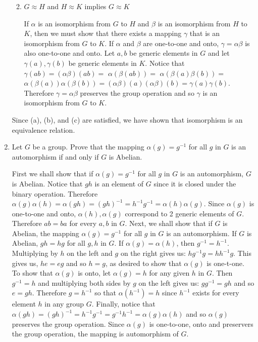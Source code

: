 \documentclass{article}
\begin{document}
\begin{enumerate}
\begin{enumerate}
\begin{flushleft}
        \end{flushleft}
        \item $G \approx H$ and $H \approx K$ implies $G \approx K$
        \begin{flushleft}
        If $\alpha$ is an isomorphism from $G$ to $H$ and $\beta$ is an isomorphism from $H$ to $K$, then we must show that there exists a mapping $\gamma$ that is an isomorphism from $G$ to $K$. If $\alpha$ and $\beta$ are one-to-one and onto, $\gamma = \alpha\beta$ is also one-to-one and onto.  Let $a, b$ be generic elements in $G$ and let $\gamma(a), \gamma(b)$ be generic elements in $K$. Notice that $\gamma(ab) = ( \alpha \beta ) ( a b ) =$ $ \alpha ( \beta ( a b ) ) =$ $ \alpha ( \beta ( a ) \beta ( b ) ) =$ $ \alpha ( \beta ( a ) ) \alpha ( \beta ( b ) ) = ( \alpha \beta ) ( a ) ( \alpha \beta ) ( b ) = \gamma(a)\gamma(b)$. Therefore $\gamma = \alpha\beta$ preserves the group operation and so $\gamma$ is an isomorphism from $G$ to $K$.
        \end{flushleft}
    \end{enumerate}
    Since (a), (b), and (c) are satisfied, we have shown that isomorphism is an equivalence relation.
    \item Let $G$ be a group. Prove that the mapping $\alpha(g) = g^{-1}$ for all $g$ in $G$ is an automorphism if and only if $G$ is Abelian.
    \begin{flushleft}
    First we shall show that if $\alpha(g) = g^{-1}$ for all $g$ in $G$ is an automorphism, $G$ is Abelian. Notice that $gh$ is an element of $G$ since it is closed under the binary operation. Therefore $\alpha(g)\alpha(h) = \alpha(gh) = (gh)^{-1} = h^{-1}g^{-1} = \alpha(h)\alpha(g)$. Since $\alpha(g)$ is one-to-one and onto, $ \alpha(h), \alpha(g)$ correspond to 2 generic elements of $G$. Therefore $ab = ba$ for every $a, b$ in $G$. Next, we shall show that if $G$ is Abelian, the mapping $\alpha(g) = g^{-1}$ for all $g$ in $G$ is an automorphism. If $G$ is Abelian, $gh = hg$ for all $g, h$ in $G$. If $\alpha(g) = \alpha(h)$, then $g^{-1} = h^{-1}$. Multiplying by $h$ on the left and $g$ on the right gives us: $hg^{-1}g = hh^{-1}g$. This gives us, $he = eg$ and so $h = g$, as desired to show that $\alpha(g)$ is one-t-one. To show that $\alpha(g)$ is onto, let $\alpha(g) = h$ for any given $h$ in $G$. Then $g^{-1} = h$ and multiplying both sides by $g$ on the left gives us: $gg^{-1} = gh$ and so $e = gh$. Therefore $g = h^{-1}$ so that $\alpha(h^{-1}) = h$ since $h^{-1}$ exists for every element $h$ in any group $G$. Finally, notice that $\alpha(gh) = (gh)^{-1} = h^{-1}g^{-1} = g^{-1}h^{-1} = \alpha(g)\alpha(h)$ and so $\alpha(g)$ preserves the group operation. Since $\alpha(g)$ is one-to-one, onto and preservers the group operation, the mapping is automorphism of $G$.

\end{flushleft}
\end{enumerate}
\end{document}
